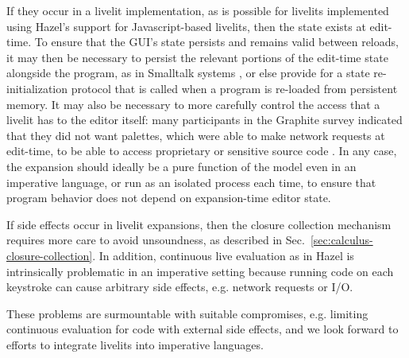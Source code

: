 If they occur in a livelit implementation,
as is possible for livelits implemented using Hazel's support for Javascript-based 
livelits, 
then the state exists at edit-time. 
To ensure that the GUI's state persists and remains valid between reloads, 
it may then be necessary to persist 
the relevant portions of the edit-time state 
alongside the program, as in Smalltalk systems \cite{Goldberg84smalltalk-80-}, or else provide for a state re-initialization protocol
that is called when a program is re-loaded from persistent memory.
It may also be necessary to more carefully control the access that a livelit 
has to the editor itself: many participants in the Graphite survey indicated 
that they did not want palettes, which were able to make network requests at edit-time, 
to be able to access 
proprietary or sensitive source code \cite{Graphite}. 
In any case, the expansion should ideally be a pure function of the model even in an imperative language, 
or run as an isolated process each time, 
to ensure that program 
behavior does not depend on expansion-time editor state. 

If side effects occur in livelit expansions, 
then the closure collection mechanism requires more 
care to avoid unsoundness, as described in Sec.~\ref{sec:calculus-closure-collection}.
In addition, continuous live evaluation as in Hazel is intrinsically problematic 
in an imperative setting because running code on each keystroke can cause arbitrary side
effects, e.g. network requests or I/O.

These problems are surmountable with suitable compromises, e.g. limiting continuous 
evaluation for code with external side effects, and we look forward to 
efforts to integrate livelits into imperative languages.

